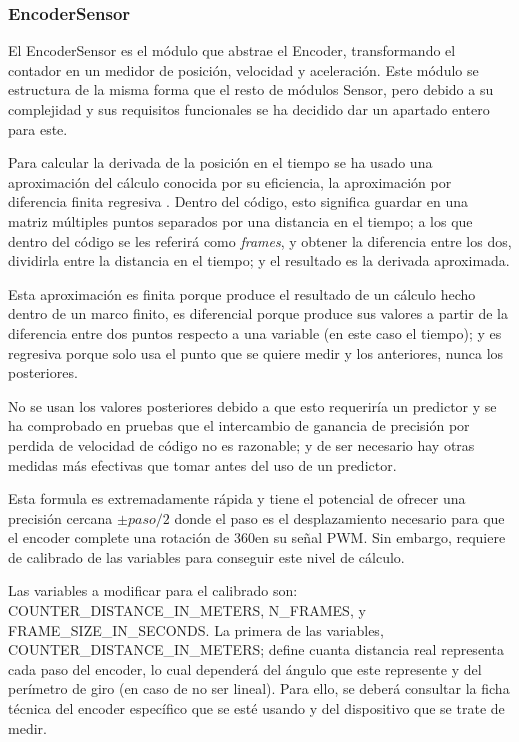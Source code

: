 \documentclass{report}
\begin{document}
\subsubsection{EncoderSensor}
El EncoderSensor es el módulo que abstrae el Encoder, transformando el contador en un medidor de posición, velocidad y aceleración. Este módulo se estructura de la misma forma que el resto de módulos Sensor, pero debido a su complejidad y sus requisitos funcionales se ha decidido dar un apartado entero para este. 
\par \vspace{0.3cm}
Para calcular la derivada de la posición en el tiempo se ha usado una aproximación del cálculo conocida por su eficiencia, la aproximación por diferencia finita regresiva \cite{web:github:EncoderWiki}. Dentro del código, esto significa guardar en una matriz múltiples puntos separados por una distancia en el tiempo; a los que dentro del código se les referirá como \textit{frames}, y obtener la diferencia entre los dos, dividirla entre la distancia en el tiempo; y el resultado es la derivada aproximada. 
\par \vspace{0.3cm}
Esta aproximación es finita porque produce el resultado de un cálculo hecho dentro de un marco finito, es diferencial porque produce sus valores a partir de la diferencia entre dos puntos respecto a una variable (en este caso el tiempo); y es regresiva porque solo usa el punto que se quiere medir y los anteriores, nunca los posteriores. \par 
No se usan los valores posteriores debido a que esto requeriría un predictor y se ha comprobado en pruebas que el intercambio de ganancia de precisión por perdida de velocidad de código no es razonable; y de ser necesario hay otras medidas más efectivas que tomar antes del uso de un predictor. 
\par \vspace{0.3cm}
Esta formula es extremadamente rápida y tiene el potencial de ofrecer una precisión cercana ${\pm}paso/2$ donde el paso es el desplazamiento necesario para que el encoder complete una rotación de 360\textdegree en su señal PWM. Sin embargo, requiere de calibrado de las variables para conseguir este nivel de cálculo. 
\par \vspace{0.3cm}
Las variables a modificar para el calibrado son: COUNTER\_DISTANCE\_IN\_METERS, N\_FRAMES, y FRAME\_SIZE\_IN\_SECONDS. La primera de las variables, COUNTER\_DISTANCE\_IN\_METERS; define cuanta distancia real representa cada paso del encoder, lo cual dependerá del ángulo que este represente y del perímetro de giro (en caso de no ser lineal). Para ello, se deberá consultar la ficha técnica del encoder específico que se esté usando y del dispositivo que se trate de medir. \par
\end{document}
